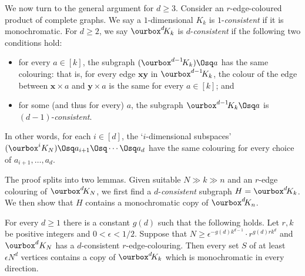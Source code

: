 We now turn to the general argument for $d\ge3$.  Consider an 
$r$-edge-coloured product of complete graphs.  We say a $1$-dimensional $K_k$ is $1$-\textit{consistent} if it is monochromatic. For $d\geq 2$, we say $\ourbox^{d}\!K_k$ is $d$-\textit{consistent} if the following two conditions hold:
\begin{itemize}
\item for every $a\in [k]$, the subgraph $(\ourbox^{d-1}\!K_k)\Osq a$ has the same colouring: that is, for every edge $\textbf{x}\textbf{y}$ in $\ourbox^{d-1}\!K_k$, the colour of the edge between $\textbf{x}\times a$ and $\textbf{y}\times a$ is the same for every $a\in [k]$; and 
\item for some (and thus for every) $a$, the subgraph $\ourbox^{d-1}\!K_k\Osq a$ is $(d-1)$-\textit{consistent}. 
\end{itemize}
In other words, for each $i\in[d]$, the `$i$-dimensional subspaces' $(\ourbox^i K_N)\Osq a_{i+1}\Osq\cdots\Osq a_d$ have the same colouring for every choice of $a_{i+1},\dots,a_d$.

The proof splits into two lemmas. Given suitable $N\gg k\gg n$ and an $r$-edge colouring of $\ourbox^d\!K_N$, we first find a  $d$-\textit{consistent}  subgraph $H=\ourbox^{d}\!K_k$. We then show that $H$ contains a monochromatic copy of $\ourbox^{d}\!K_n$. 


\begin{lemma}\label{lem: 1}
For every $d\ge1$ there is a constant $g(d)$ such that the following holds.  Let $r,k$ be positive integers and $0<\epsilon<1/2$. Suppose that 
$N\geq \epsilon^{-g(d)k^{d-1}}\cdot r^{g(d)rk^{d}}$ and $\ourbox^d K_N$ has a $d$-consistent $r$-edge-colouring. Then every set $S$ of at least $\epsilon N^{d}$ vertices contains a copy of $\ourbox^{d}\!K_k$ which is monochromatic in every direction. 
\end{lemma}


